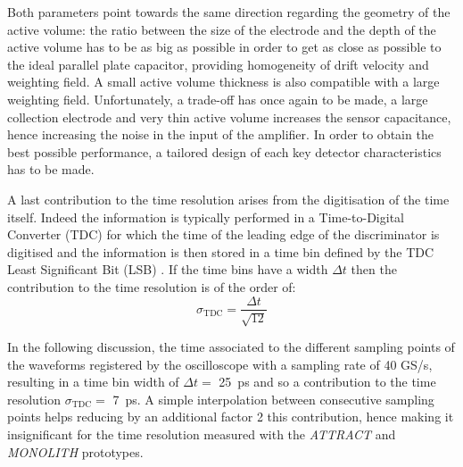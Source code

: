 		Both parameters point towards the same direction regarding the geometry of the active volume: the ratio between the size of the electrode and the depth of the active volume has to be as big as possible in order to get as close as possible to the ideal parallel plate capacitor, providing homogeneity of drift velocity and weighting field. A small active volume thickness is also compatible with a large weighting field. Unfortunately, a trade-off has once again to be made, a large collection electrode and very thin active volume increases the sensor capacitance, hence increasing the noise in the input of the amplifier. In order to obtain the best possible performance, a tailored design of each key detector characteristics has to be made. 
		
		A last contribution to the time resolution arises from the digitisation of the time itself. Indeed the information is typically performed in a Time-to-Digital Converter (TDC) for which the time of the leading edge of the discriminator is digitised and the information is then stored in a time bin defined by the TDC Least Significant Bit (LSB) \cite{timepix4}. If the time bins have a width $\Delta t$ then the contribution to the time resolution is of the order of: 
		\begin{equation}
			\sigma_{\text{TDC}} = \frac{\Delta t}{\sqrt{12}}
		\end{equation}
		
		In the following discussion, the time associated to the different sampling points of the waveforms registered by the oscilloscope with a sampling rate of 40 GS/s, resulting in a time bin width of $\Delta t = $ \SI{25}{\pico\second} and so a contribution to the time resolution $\sigma_{\text{TDC}} =$ \SI{7}{\pico\second}. A simple interpolation between consecutive sampling points helps reducing by an additional factor 2 this contribution, hence making it insignificant for the time resolution measured with the \textit{ATTRACT} and \textit{MONOLITH} prototypes. 
	\clearpage
